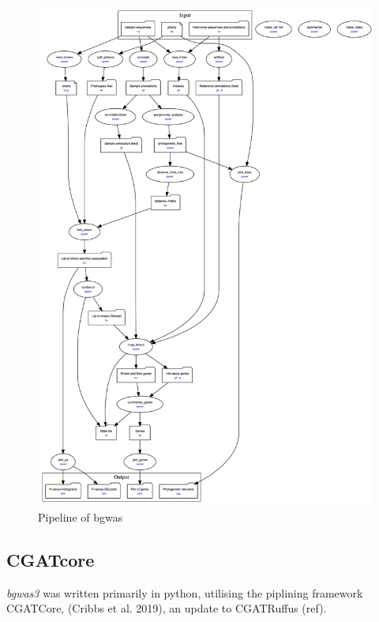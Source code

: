 \documentclass[]{article}
\begin{document}
\begin{figure}

{\centering \includegraphics[height=0.9\textheight]{_static/pipe} 

}

\caption{\label{fig:pipe}Pipeline of bgwas}\label{fig:unnamed-chunk-1}
\end{figure}

\hypertarget{cgatcore}{%
\subsection{CGATcore}\label{cgatcore}}

\emph{bgwas3} was written primarily in python, utilising the piplining
framework CGATCore, (Cribbs et al. 2019), an update to CGATRuffus (ref).
\end{document}
